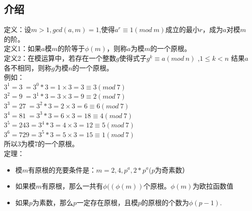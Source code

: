 \subsection{介绍}
定义：设$m>1,gcd(a,m)=1$,使得$a^r \equiv 1(mod\  m)$成立的最小$r$，成为$a$对模$m$的阶。 \\
定义1：如果$a$模$m$的阶等于$\phi(m)$，则称$a$为模$m$的一个原根。 \\
定义2：在模运算中，若存在一个整数$g$使得式子$g^k ≡ a( mod\  n)$ ,$ 1\leq  k < n$ 结果$a$各不相同，则称$g$为模$n$的一个原根。 \\
例如： \\
$3^1 =   3 \ = 3^0 *3 = 1×3 =  3 \equiv 3( mod \ 7) $ \\
$3^2 =   9 \  = 3^1 *3 = 3×3 =  9 \equiv 2( mod\ 7)$ \\
$3^3 =  27 \ = 3^2 *3 = 2×3 =  6 \equiv 6( mod\ 7)$ \\
$3^4 =  81\  = 3^3 *3 = 6×3 = 18 \equiv 4( mod\ 7)$ \\
$3^5 = 243 = 3^4 *3 = 4×3 = 12 \equiv 5( mod\ 7)$ \\
$3^6 = 729 = 3^5 *3 = 5×3 = 15 \equiv 1( mod\ 7)$ \\
所以3为模7的一个原根。 \\
定理： \\
\begin{itemize}
\item  模$m$有原根的充要条件是：$m = 2, 4, p^a, 2 * p^a $($p$为奇素数）
\item  如果模$m$有原根，那么一共有$\phi((\phi(m))$个原根。$\phi(m)$为欧拉函数值
\item  如果$p$为素数，那么$p$一定存在原根，且模$p$的原根的个数为$\phi(p - 1)$.
\end{itemize}

